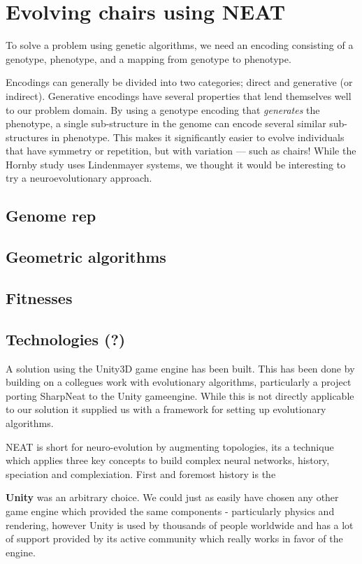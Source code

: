 \section{Evolving chairs using NEAT}
To solve a problem using genetic algorithms, we need an encoding
consisting of a genotype, phenotype, and a mapping from genotype to phenotype.

Encodings can generally be divided into two categories; direct and generative
(or indirect). Generative encodings have several properties that lend themselves
well to our problem domain. By using a genotype encoding that \textit{generates}
the phenotype, a single sub-structure in the genome can encode several similar
sub-structures in phenotype. This makes it significantly easier to evolve
individuals that have symmetry or repetition, but with variation --- such as
chairs! While the Hornby study\cite{paper:ev4} uses Lindenmayer
systems\cite{Hornby2003}, we thought it would be interesting to try a
neuroevolutionary approach. \cite{Stanley2007} 

\subsection{Genome rep}
\subsection{Geometric algorithms}
\subsection{Fitnesses}
\subsection{Technologies (?)}

A solution using the Unity3D\cite{web:unity} game engine has been built. This has been done by building on a collegues work with evolutionary algorithms, particularly a project porting SharpNeat\cite{web:unityneat} to the Unity gameengine\cite{web:sharpneat}. While this is not directly applicable to our solution it supplied us with a framework for setting up evolutionary algorithms.

NEAT is short for neuro-evolution by augmenting topologies, its a technique which applies three key concepts to build complex neural networks, history, speciation and complexiation. First and foremost history is the 
    
\textbf{Unity} was an arbitrary choice. We could just as easily have chosen any other game engine which provided the same components - particularly physics and rendering, however Unity is used by thousands of people worldwide and has a lot of support provided by its active community which really works in favor of the engine.


